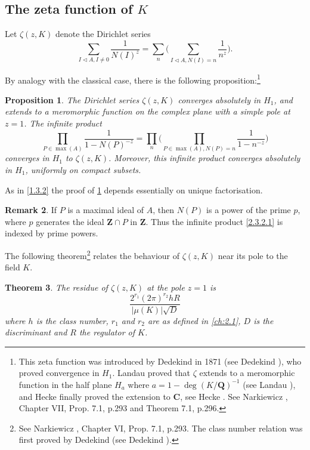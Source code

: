 \documentclass[10pt]{article}
\newtheorem{theo}{Theorem}[subsection]
\newtheorem{prop}[theo]{Proposition}
\theoremstyle{definition}
\newtheorem{rema}[theo]{Remark}
\def\ZZ{\mathbf{Z}}
\def\QQ{\mathbf{Q}}
\def\CC{\mathbf{C}}
\newcommand{\tri}{\mathbin{\triangleleft}}
\def\fnonse{This zeta function was introduced by Dedekind in 1871 (see Dedekind \cite{bib:37}), who proved convergence in $H_1$. Landau proved that $\zeta$ extends to a meromorphic function in the half plane $H_a$ where $a = 1 - \deg(K / \QQ)^{-1}$ (see Landau \cite{bib:116}), and Hecke finally proved the extension to $\CC$, see Hecke \cite{bib:94}. See Narkiewicz \cite{bib:146}, Chapter VII, Prop. 7.1, p.293 and Theorem 7.1, p.296.}
\def\fnonei{See Narkiewicz \cite{bib:146}, Chapter VI, Prop. 7.1, p.293. The class number relation was first proved by Dedekind (see Dedekind \cite{bib:37}).}
\begin{document}
\subsection[The zeta function of K]{The zeta function of $K$}
\label{ch:2.3}

Let $\zeta(z,K)$ denote the Dirichlet series
\begin{equation}
\label{2.3.1}
\sum_{I \tri A, I\not=0} \frac{1}{N(I)^z}
= \sum_n \biggl(
\sum_{I \tri A, N(I)=n} \frac{1}{n^z}
\biggr).
\end{equation}

By analogy with the classical case, there is the following proposition:\footnote{\fnonse}


\begin{prop}
\label{2.3.2}
The Dirichlet series $\zeta(z,K)$ converges absolutely in $H_1$, and extends to a meromorphic function on the complex plane with a simple pole at $z = 1$.
The infinite product
\begin{equation}
\label{2.3.2.1}
\prod_{P \in \max(A)} \frac{1}{1 - N(P)^{-z}}
= \prod_n\biggl(
\prod_{P \in \max(A), N(P)=n} \frac{1}{1-n^{-z}}
\biggr)
\end{equation}
converges in $H_1$ to $\zeta(z,K)$.
Moreover, this infinite product converges absolutely in $H_1$, uniformly on compact subsets.
\end{prop}


As in \ref{1.3.2} the proof of \ref{2.3.2} depends essentially on unique factorisation.


\begin{rema}
\label{2.3.3}
If $P$ is a maximal ideal of $A$, then $N(P)$ is a power of the prime $p$, where $p$ generates the ideal $\ZZ \cap P$ in $\ZZ$.
Thus the infinite product \eqref{2.3.2.1} is indexed by prime powers.
\end{rema}

The following theorem\footnote{\fnonei} relates the behaviour of $\zeta(z,K)$ near its pole to the field $K$.


\begin{theo}
\label{2.3.4}
The residue of $\zeta(z,K)$ at the pole $z = 1$ is
\begin{equation}
\label{2.3.4.1}
\frac{2^{r_1} (2\pi)^{r_2} h R}{|\mu(K)| \sqrt D}
\end{equation}
where $h$ is the class number, $r_1$ and $r_2$ are as defined in \ref{ch:2.1}, $D$ is the discriminant and $R$ the regulator of $K$.
\end{theo}
\end{document}
